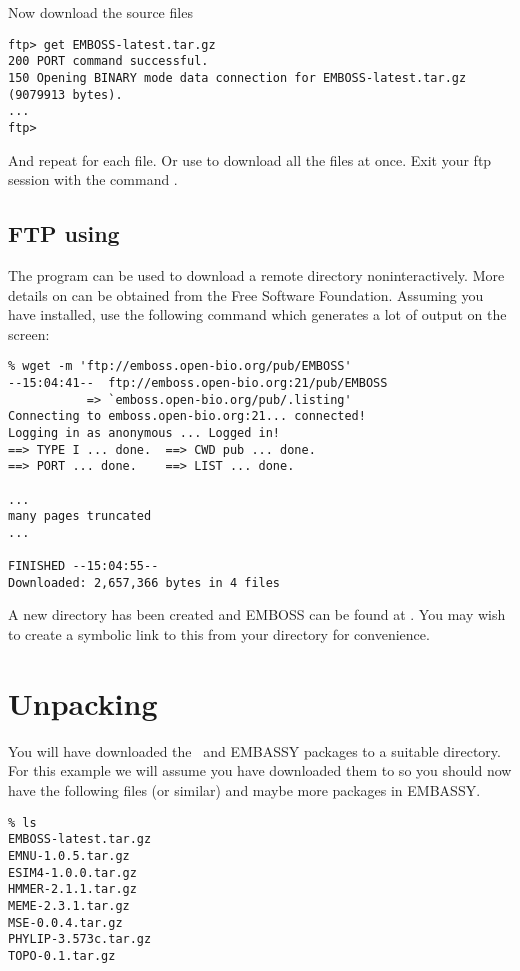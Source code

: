 \documentclass{report}
\begin{document}
Now download the source files

\begin{verbatim}
ftp> get EMBOSS-latest.tar.gz
200 PORT command successful.
150 Opening BINARY mode data connection for EMBOSS-latest.tar.gz 
(9079913 bytes).
...
ftp>
\end{verbatim}

And repeat for each file. Or use  to download all the
files at once.  Exit your ftp session with the command .

\subsection{FTP using }
The program  can be used to download a remote directory
noninteractively. More details on  can be obtained from
the Free Software Foundation. Assuming you
have  installed, use the following command which
generates a lot of output on the screen:

\begin{verbatim}
% wget -m 'ftp://emboss.open-bio.org/pub/EMBOSS'
--15:04:41--  ftp://emboss.open-bio.org:21/pub/EMBOSS
           => `emboss.open-bio.org/pub/.listing'
Connecting to emboss.open-bio.org:21... connected!
Logging in as anonymous ... Logged in!
==> TYPE I ... done.  ==> CWD pub ... done.
==> PORT ... done.    ==> LIST ... done.

...
many pages truncated
...

FINISHED --15:04:55--
Downloaded: 2,657,366 bytes in 4 files
\end{verbatim}

A new directory  has been created and
EMBOSS can be found at . You
may wish to create a symbolic link to this from your
 directory for convenience.


\section{Unpacking}

You will have downloaded the \EMBOSS\ and EMBASSY packages to a
suitable directory. For this example we will assume you have
downloaded them to  so you should now have the
following files (or similar) and maybe more packages in EMBASSY.

\begin{verbatim}
% ls
EMBOSS-latest.tar.gz
EMNU-1.0.5.tar.gz
ESIM4-1.0.0.tar.gz
HMMER-2.1.1.tar.gz
MEME-2.3.1.tar.gz
MSE-0.0.4.tar.gz
PHYLIP-3.573c.tar.gz
TOPO-0.1.tar.gz
\end{verbatim}
\end{document}
